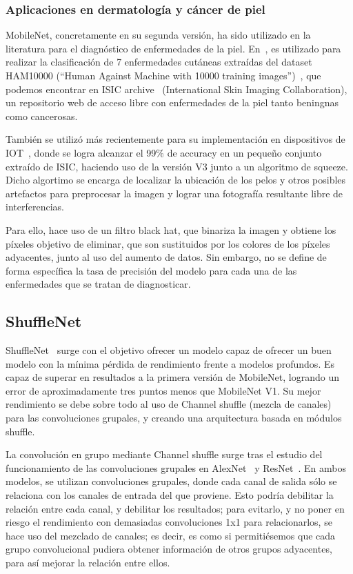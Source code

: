 \subsubsection{Aplicaciones en dermatología y cáncer de piel}

MobileNet, concretamente en su segunda versión, ha sido utilizado en la literatura para el diagnóstico de enfermedades de la piel. En~\cite{Chaturvedi_2020}, es utilizado para realizar la clasificación de 7 enfermedades cutáneas extraídas del dataset HAM10000 (``Human Against Machine with 10000 training images'')~\cite{ham10000}, que podemos encontrar en ISIC archive~\cite{isicarchive} (International Skin Imaging Collaboration), un repositorio web de acceso libre con enfermedades de la piel tanto beningnas como cancerosas. 

También se utilizó más recientemente para su implementación en dispositivos de IOT~\cite{mnetsqueeze}, donde se logra alcanzar el 99\% de accuracy en un pequeño conjunto extraído de ISIC, haciendo uso de la versión V3 junto a un algoritmo de squeeze. Dicho algortimo se encarga de localizar la ubicación de los pelos y otros posibles artefactos para preprocesar la imagen y lograr una fotografía resultante libre de interferencias. 

Para ello, hace uso de un filtro black hat, que binariza la imagen y obtiene los píxeles objetivo de eliminar, que son sustituidos por los colores de los píxeles adyacentes, junto al uso del aumento de datos. Sin embargo, no se define de forma específica la tasa de precisión del modelo para cada una de las enfermedades que se tratan de diagnosticar.

\subsection{ShuffleNet}

ShuffleNet~\cite{zhang2017shufflenet,shufflenetreview} surge con el objetivo ofrecer un modelo capaz de ofrecer un buen modelo con la mínima pérdida de rendimiento frente a modelos profundos. Es capaz de superar en resultados a la primera versión de MobileNet, logrando un error de aproximadamente tres puntos menos que MobileNet V1. Su mejor rendimiento se debe sobre todo al uso de Channel shuffle (mezcla de canales) para las convoluciones grupales, y creando una arquitectura basada en módulos shuffle.

La convolución en grupo mediante Channel shuffle surge tras el estudio del funcionamiento de las convoluciones grupales en 	AlexNet~\cite{NIPS2012_c399862d} y ResNet~\cite{DBLP:journals/corr/HeZRS15}. En ambos modelos, se utilizan convoluciones grupales, donde cada canal de salida sólo se relaciona con los canales de entrada del que proviene. Esto podría debilitar la relación entre cada canal, y debilitar los resultados; para evitarlo, y no poner en riesgo el rendimiento con demasiadas convoluciones 1x1 para relacionarlos, se hace uso del mezclado de canales; es decir, es como si permitiésemos que cada grupo convolucional pudiera obtener información de otros grupos adyacentes, para así mejorar la relación entre ellos.

